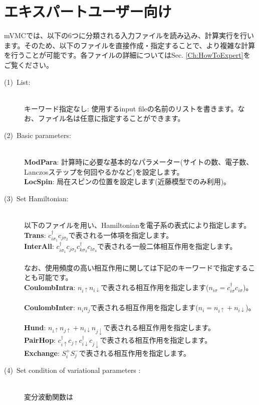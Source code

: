 \section{エキスパートユーザー向け}
mVMCでは、以下の6つに分類される入力ファイルを読み込み、計算実行を行います。そのため、以下のファイルを直接作成・指定することで、より複雑な計算を行うことが可能です。各ファイルの詳細についてはSec. \ref{Ch:HowToExpert}をご覧ください。
\\
\begin{description}
\item[(1)~List:]
~\\{キーワード指定なし}:
使用するinput fileの名前のリストを書きます。なお、ファイル名は任意に指定することができます。
\item[(2)~Basic parameters:]
~\\{\bf ModPara}: 計算時に必要な基本的なパラメーター(サイトの数、電子数、Lanczosステップを何回やるかなど)を設定します。
~\\{\bf LocSpin}: 局在スピンの位置を設定します(近藤模型でのみ利用)。
\item[(3)~Set Hamiltonian:] 
~\\以下のファイルを用い、Hamiltonianを電子系の表式により指定します。
~\\{\bf Trans}: $c_{i\sigma_1}^{\dag}c_{j\sigma_2}$で表される一体項を指定します。
~\\{\bf InterAll}: $c_ {i \sigma_1}^{\dag}c_{j\sigma_2}c_{k \sigma_3}^{\dag}c_{l \sigma_4}$で表される一般二体相互作用を指定します。\\
~\\なお、使用頻度の高い相互作用に関しては下記のキーワードで指定することも可能です。
~\\{\bf CoulombIntra}: $n_ {i \uparrow}n_{i \downarrow}$で表される相互作用を指定します($n_{i \sigma}=c_{i\sigma}^{\dag}c_{i\sigma}$)。
~\\{\bf CoulombInter}: $n_ {i}n_{j}$で表される相互作用を指定します($n_i=n_{i\uparrow}+n_{i\downarrow}$)。
~\\{\bf Hund}: $n_{i\uparrow}n_{j\uparrow}+n_{i\downarrow}n_{j\downarrow}$で表される相互作用を指定します。
~\\{\bf PairHop}:  $c_ {i \uparrow}^{\dag}c_{j\uparrow}c_{i \downarrow}^{\dag}c_{j  \downarrow}$で表される相互作用を指定します。
~\\{\bf Exchange}: $S_i^+ S_j^-$で表される相互作用を指定します。
\item[(4)~Set condition of variational parameters :] 
~\\変分波動関数は

\end{description}
